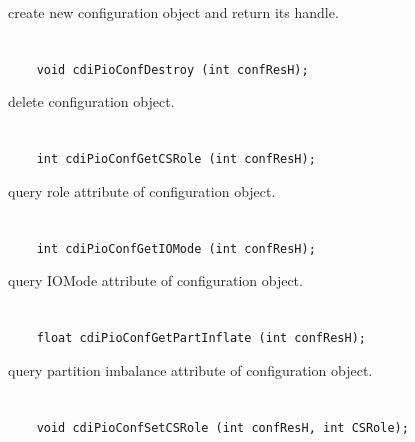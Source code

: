 create new configuration object and return its handle.


\section*{\tt {}}

\begin{verbatim}
    void cdiPioConfDestroy (int confResH);
\end{verbatim}

delete configuration object.


\section*{\tt {}}

\begin{verbatim}
    int cdiPioConfGetCSRole (int confResH);
\end{verbatim}

query role attribute of configuration object.


\section*{\tt {}}

\begin{verbatim}
    int cdiPioConfGetIOMode (int confResH);
\end{verbatim}

query IOMode attribute of configuration object.


\section*{\tt {}}

\begin{verbatim}
    float cdiPioConfGetPartInflate (int confResH);
\end{verbatim}

query partition imbalance attribute of
configuration object.


\section*{\tt {}}

\begin{verbatim}
    void cdiPioConfSetCSRole (int confResH, int CSRole);
\end{verbatim}

